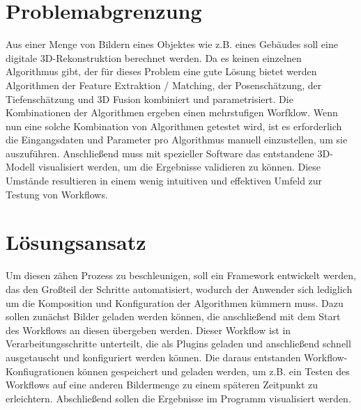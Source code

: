 
\section{Problemabgrenzung}
Aus einer Menge von Bildern eines Objektes wie z.B. eines Gebäudes soll eine digitale 3D-Rekonstruktion berechnet werden.\newline
Da es keinen einzelnen Algorithmus gibt, der für dieses Problem eine gute Lösung bietet werden Algorithmen der Feature Extraktion / Matching, der Posenschätzung, der Tiefenschätzung und 3D Fusion kombiniert und parametrisiert. Die Kombinationen der Algorithmen ergeben einen mehrstufigen Worfklow. Wenn nun eine solche Kombination von Algorithmen getestet wird, ist es erforderlich die Eingangsdaten und Parameter pro Algorithmus manuell einzustellen, um sie auszuführen. Anschließend muss mit spezieller Software das entstandene 3D-Modell visualisiert werden, um die Ergebnisse validieren zu können.\newline
Diese Umstände resultieren in einem wenig intuitiven und effektiven Umfeld zur Testung von Workflows.

\section{Lösungsansatz}
Um diesen zähen Prozess zu beschleunigen, soll ein Framework entwickelt werden, das den Großteil der Schritte automatisiert, wodurch der Anwender sich lediglich um die Komposition und Konfiguration der Algorithmen kümmern muss. Dazu sollen zunächst Bilder geladen werden können, die anschließend mit dem Start des Workflows an diesen übergeben werden. Dieser Workflow ist in Verarbeitungsschritte unterteilt, die als Plugins geladen und anschließend schnell ausgetauscht und konfiguriert werden können. Die daraus entstanden Workflow-Konfiugrationen können gespeichert und geladen werden, um z.B. ein Testen des Workflows auf eine anderen Bildermenge zu einem späteren Zeitpunkt zu erleichtern. Abschließend sollen die Ergebnisse im Programm visualisiert werden.